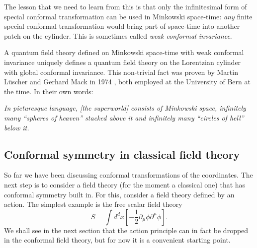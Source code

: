 \documentclass[a4paper,12pt]{article}
\numberwithin{equation}{section}
\begin{document}
The lesson that we need to learn from this is that only the infinitesimal form of special conformal transformation can be used in Minkowski space-time: \emph{any} finite special conformal transformation would bring part of space-time into another patch on the cylinder.
This is sometimes called \emph{weak conformal invariance}.

A quantum field theory defined on Minkowski space-time with weak conformal invariance uniquely defines a quantum field theory on the Lorentzian cylinder with global conformal invariance. This non-trivial fact was proven by Martin Lüscher and Gerhard Mack in 1974 \cite{Luscher:1974ez}, both employed at the University of Bern at the time. In their own words:

\begin{center}

\parbox{11cm}{%
\emph{In picturesque language, [the superworld] consists of Minkowski space, infinitely many ``spheres of heaven'' stacked above it and infinitely many ``circles of hell'' below it.}}

\end{center}


\subsection{Conformal symmetry in classical field theory}

So far we have been discussing conformal transformations of the coordinates. The next step is to consider a field theory (for the moment a classical one) that has conformal symmetry built in. For this, consider a field theory defined by an action. The simplest example is the free scalar field theory
\begin{equation}
	S = \int d^dx
	\left[ - \frac{1}{2} \partial_\mu \phi \partial^\mu \phi \right].
	\label{eq:freescalaraction}
\end{equation}
We shall see in the next section that the action principle can in fact be dropped in the conformal field theory, but for now it is a convenient starting point.
\end{document}
